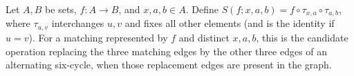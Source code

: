 \begin{definition}
Let $A,B$ be sets, $f:A\to B$, and $x,a,b\in A$. Define
$S(f;x,a,b)=f\circ\tau_{x,a}\circ\tau_{a,b}$, where $\tau_{u,v}$
interchanges $u,v$ and fixes all other elements (and is the identity if
$u=v$). For a matching represented by $f$ and distinct $x,a,b$, this is
the candidate operation replacing the three matching edges by the other
three edges of an alternating six-cycle, when those replacement edges
are present in the graph.
\end{definition}
